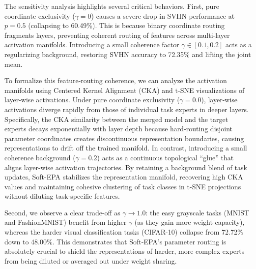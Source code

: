 The sensitivity analysis highlights several critical behaviors. First, pure coordinate exclusivity ($\gamma=0$) causes a severe drop in SVHN performance at $p=0.5$ (collapsing to 60.49\%). This is because binary coordinate routing fragments layers, preventing coherent routing of features across multi-layer activation manifolds. Introducing a small coherence factor $\gamma \in [0.1, 0.2]$ acts as a regularizing background, restoring SVHN accuracy to 72.35\% and lifting the joint mean. 

To formalize this feature-routing coherence, we can analyze the activation manifolds using Centered Kernel Alignment (CKA) and t-SNE visualizations of layer-wise activations. Under pure coordinate exclusivity ($\gamma = 0.0$), layer-wise activations diverge rapidly from those of individual task experts in deeper layers. Specifically, the CKA similarity between the merged model and the target experts decays exponentially with layer depth because hard-routing disjoint parameter coordinates creates discontinuous representation boundaries, causing representations to drift off the trained manifold. In contrast, introducing a small coherence background ($\gamma = 0.2$) acts as a continuous topological ``glue'' that aligns layer-wise activation trajectories. By retaining a background blend of task updates, Soft-EPA stabilizes the representation manifold, recovering high CKA values and maintaining cohesive clustering of task classes in t-SNE projections without diluting task-specific features.

Second, we observe a clear trade-off as $\gamma \to 1.0$: the easy grayscale tasks (MNIST and FashionMNIST) benefit from higher $\gamma$ (as they gain more weight capacity), whereas the harder visual classification tasks (CIFAR-10) collapse from 72.72\% down to 48.00\%. This demonstrates that Soft-EPA's parameter routing is absolutely crucial to shield the representations of harder, more complex experts from being diluted or averaged out under weight sharing.

